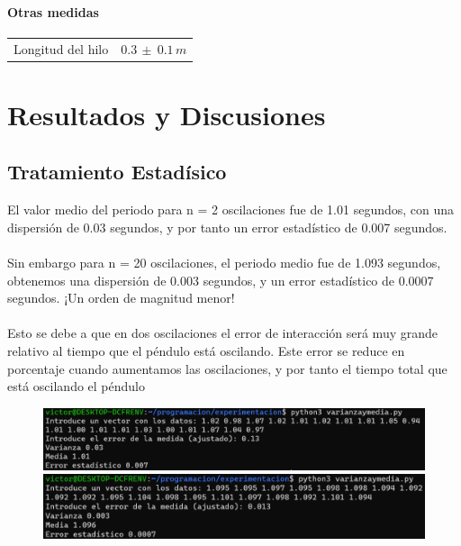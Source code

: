 \documentclass{article}
\begin{document}
\paragraph{Otras medidas}\mbox{}
    \begin{tabular}{ll}
        Longitud del hilo& $0.3\,\pm\  0.1\,m$\\
    \end{tabular}    

\section{Resultados y Discusiones}
\subsection{Tratamiento Estadísico}
El valor medio del periodo para n = 2 oscilaciones fue de 1.01 segundos, con una dispersión de 0.03 segundos, y por tanto un error estadístico de 0.007 segundos. \\\\
Sin embargo para n = 20 oscilaciones, el periodo medio fue de 1.093 segundos, obtenemos una dispersión de 0.003 segundos, y un error estadístico de 0.0007 segundos. ¡Un orden de magnitud menor! \\\\Esto se debe a que en dos oscilaciones el error de interacción será muy grande relativo al tiempo que el péndulo está oscilando. Este error se reduce en porcentaje cuando aumentamos las oscilaciones, y por tanto el tiempo total que está oscilando el péndulo

\begin{figure}[h]
\centering
\hspace*{-2.2cm}
\includegraphics[width=.56\textwidth]{fotos/ErrEst2corto.png}\hfill
\includegraphics[width=.56\textwidth]{fotos/ErrEst20corto.png}
\hspace*{-2.2cm}
\end{figure}
\end{document}
